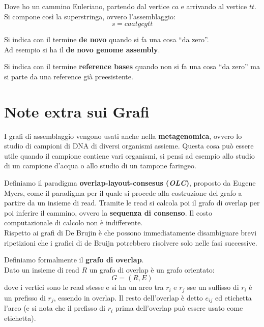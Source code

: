 \documentclass[a4paper,12pt, oneside]{book}
\begin{document}
\begin{esempio}
\begin{figure}[H]
  \end{figure}
  Dove ho un cammino Euleriano, partendo dal vertice $ca$ e arrivando al vertice
  $tt$. Si compone così la superstringa, ovvero l'assemblaggio: 
  \[s=caatgcgtt\]
\end{esempio}
\begin{definizione}
  Si indica con il termine \textbf{de novo} quando si fa una cosa ``da zero''.\\
  Ad esempio si ha il \textbf{de novo genome assembly}.
\end{definizione}
\begin{definizione}
  Si indica con il termine \textbf{reference bases} quando non si fa una cosa
  ``da zero'' ma si parte da una reference già preesistente. 
\end{definizione}
\section{Note extra sui Grafi}
I grafi di assemblaggio vengono usati anche nella \textbf{metagenomica}, ovvero
lo studio di campioni di DNA di diversi organismi assieme. Questa cosa può
essere utile quando il campione contiene vari organismi, si pensi ad esempio
allo studio di un campione d'acqua o allo studio di un tampone faringeo.\\
\begin{definizione}
  Definiamo il paradigma \textbf{overlap-layout-consesus (\textit{OLC})},
  proposto da Eugene Myers, come il
  paradigma per il quale si procede alla costruzione del grafo a partire da un
  insieme di read. Tramite le read si calcola poi il grafo di overlap per poi
  inferire il cammino, ovvero la \textbf{sequenza di consenso}. Il costo
  computazionale di calcolo non è indifferente.\\
  Rispetto ai grafi di De Brujin è che possono immediatamente disambiguare brevi
  ripetizioni che i grafici di de Bruijn potrebbero risolvere solo nelle fasi
  successive.
\end{definizione}
\begin{definizione}
  Definiamo formalmente il \textbf{grafo di overlap}.\\
  Dato un insieme di read $R$ un grafo di overlap è un grafo orientato:
  \[G=(R,E)\]
  dove i vertici sono le read stesse e si ha un arco tra $r_i$ e $r_j$ sse un
  suffisso di $r_i$ è un prefisso di $r_j$, essendo in overlap. Il resto
  dell'overlap è detto $e_{ij}$ ed etichetta l'arco (e si nota che il prefisso
  di $r_i$ prima dell'overlap può essere usato come etichetta).
  
\end{definizione}
\end{document}
